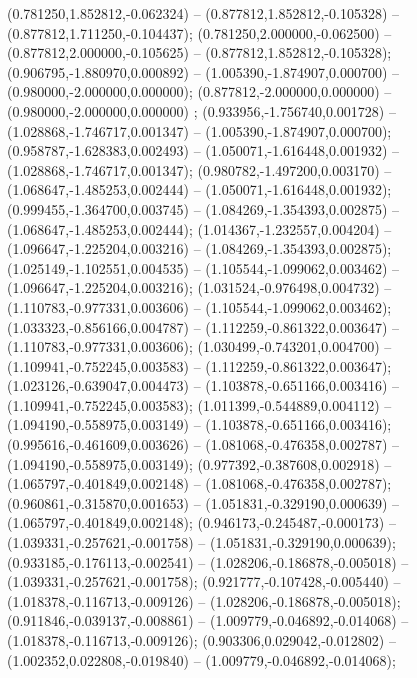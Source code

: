  (0.781250,1.852812,-0.062324) -- (0.877812,1.852812,-0.105328) -- (0.877812,1.711250,-0.104437);
 (0.781250,2.000000,-0.062500) -- (0.877812,2.000000,-0.105625) -- (0.877812,1.852812,-0.105328);
 (0.906795,-1.880970,0.000892) -- (1.005390,-1.874907,0.000700) -- (0.980000,-2.000000,0.000000);
 (0.877812,-2.000000,0.000000) -- (0.980000,-2.000000,0.000000) ;
 (0.933956,-1.756740,0.001728) -- (1.028868,-1.746717,0.001347) -- (1.005390,-1.874907,0.000700);
 (0.958787,-1.628383,0.002493) -- (1.050071,-1.616448,0.001932) -- (1.028868,-1.746717,0.001347);
 (0.980782,-1.497200,0.003170) -- (1.068647,-1.485253,0.002444) -- (1.050071,-1.616448,0.001932);
 (0.999455,-1.364700,0.003745) -- (1.084269,-1.354393,0.002875) -- (1.068647,-1.485253,0.002444);
 (1.014367,-1.232557,0.004204) -- (1.096647,-1.225204,0.003216) -- (1.084269,-1.354393,0.002875);
 (1.025149,-1.102551,0.004535) -- (1.105544,-1.099062,0.003462) -- (1.096647,-1.225204,0.003216);
 (1.031524,-0.976498,0.004732) -- (1.110783,-0.977331,0.003606) -- (1.105544,-1.099062,0.003462);
 (1.033323,-0.856166,0.004787) -- (1.112259,-0.861322,0.003647) -- (1.110783,-0.977331,0.003606);
 (1.030499,-0.743201,0.004700) -- (1.109941,-0.752245,0.003583) -- (1.112259,-0.861322,0.003647);
 (1.023126,-0.639047,0.004473) -- (1.103878,-0.651166,0.003416) -- (1.109941,-0.752245,0.003583);
 (1.011399,-0.544889,0.004112) -- (1.094190,-0.558975,0.003149) -- (1.103878,-0.651166,0.003416);
 (0.995616,-0.461609,0.003626) -- (1.081068,-0.476358,0.002787) -- (1.094190,-0.558975,0.003149);
 (0.977392,-0.387608,0.002918) -- (1.065797,-0.401849,0.002148) -- (1.081068,-0.476358,0.002787);
 (0.960861,-0.315870,0.001653) -- (1.051831,-0.329190,0.000639) -- (1.065797,-0.401849,0.002148);
 (0.946173,-0.245487,-0.000173) -- (1.039331,-0.257621,-0.001758) -- (1.051831,-0.329190,0.000639);
 (0.933185,-0.176113,-0.002541) -- (1.028206,-0.186878,-0.005018) -- (1.039331,-0.257621,-0.001758);
 (0.921777,-0.107428,-0.005440) -- (1.018378,-0.116713,-0.009126) -- (1.028206,-0.186878,-0.005018);
 (0.911846,-0.039137,-0.008861) -- (1.009779,-0.046892,-0.014068) -- (1.018378,-0.116713,-0.009126);
 (0.903306,0.029042,-0.012802) -- (1.002352,0.022808,-0.019840) -- (1.009779,-0.046892,-0.014068);
